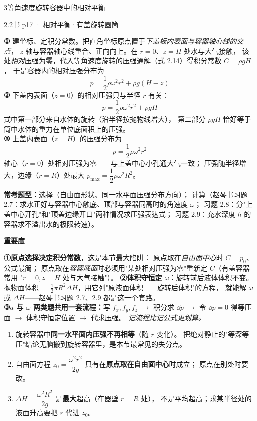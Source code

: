 \begin{kaodian}{3}{等角速度旋转容器中的相对平衡}
\begin{liti}{2.2}{书 p17 · 相对平衡·有盖旋转圆筒}
\begin{jie}
\textbf{① }建坐标、定积分常数。把直角坐标原点置于\emph{下盖板内表面与容器轴心线的交点}，
$z$ 轴与容器轴心线重合、正向向上。在 $r=0$、$z=H$ 处水与大气接触，
该处\emph{相对}压强为零，代入等角速度旋转的压强通解（式 2.14）得积分常数 $C=\rho gH$，
于是容器内的相对压强分布为
\[ p=\frac{1}{2}\rho\omega^2r^2+\rho g(H-z) \]
\textbf{② }下盖内表面（$z=0$）的相对压强只与半径 $r$ 有关：
\[ p=\frac{1}{2}\rho\omega^2r^2+\rho gH \]
式中第一部分来自水体的旋转（沿半径按抛物线增大），
第二部分 $\rho gH$ 恰好等于筒中水体的重力在单位底面积上的压强。\\
\textbf{③ }上盖内表面（$z=H$）的压强分布为
\[ p=\frac{1}{2}\rho\omega^2r^2 \]
轴心（$r=0$）处相对压强为零——与上盖中心小孔通大气一致；
压强随半径增大，边缘（$r=R$）处最大 $p_{\max}=\dfrac{1}{2}\rho\omega^2R^2$。
\end{jie}
\end{liti}

\textbf{常考题型：}选择（自由面形状、同一水平面压强分布方向）；
计算（赵琴书习题 2.7：求水正好与容器中心触底、顶部与容器同高时的角速度 $\omega$；
习题 2.8：分"上盖中心开孔"和"顶盖边缘开口"两种情况求压强表达式；
习题 2.9：充水深度 $h$ 的容器求不溢出水的极限转速）。

\textbf{重要度 }\quad{}\quad{}

\begin{banfa}
\textbf{①原点选择决定积分常数}，这是本节最大陷阱：
原点取在\emph{自由面中心}时 $C=p_0$、公式最简；
原点取在\emph{容器底面}时必须用"某处相对压强为零"重新定 $C$（有盖容器常用
"$r=0,z=H$ 处与大气接触"）。
\textbf{②体积守恒定 $\omega$}：旋转前后液体体积不变。
抛物面体积 $=\frac{1}{2}\pi R^2\Delta H$，用它列"原液面体积 $=$ 旋转后体积"的方程，
就能解 $\omega$ 或 $\Delta H$——赵琴书习题 2.7、2.9 都是这一个套路。\\
\textbf{③$a$ 与 $\omega$ 两类题共用一套流程：}写 $f_x,f_y,f_z$ $\to$ 积分求 $\dd p$
$\to$ 令 $\dd p=0$ 得等压面 $\to$ 体积守恒定位置 $\to$ 代求压强。
\emph{记流程比记公式更划算。}
\end{banfa}

\begin{yicuo}
\begin{enumerate}
\item 旋转容器中\textbf{同一水平面内压强不再相等}（随 $r$ 变化）。
  把绝对静止的"等深等压"结论无脑搬到旋转容器里，是本节最常见的失分点。\\
\item 自由面方程 $z_0=\dfrac{\omega^2r^2}{2g}$ 只有在\textbf{原点取在自由面中心}时成立；
  原点在别处时要改。\\
\item $\Delta H=\dfrac{\omega^2R^2}{2g}$ 是\textbf{最大}超高（在器壁 $r=R$ 处），
  不是平均超高；求某半径处的液面升高要把 $r$ 代进 $z_0$。
\end{enumerate}
\end{yicuo}
\end{kaodian}

